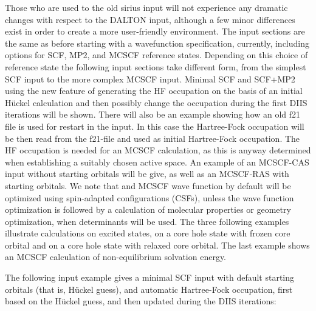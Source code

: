 Those who are used to the old {\sc sirius} input will not experience
any dramatic changes with respect to the DALTON
input, although a few minor differences exist in order
to create a more user-friendly environment. The input sections are the
same as before starting with a wavefunction specification, currently,
including options for SCF, MP2, and MCSCF reference states. Depending
on this choice of reference state the following input sections take
different form, from the simplest SCF input to the more complex MCSCF
input. Minimal SCF and SCF+MP2
using the new feature of generating the HF
occupation on the basis of an initial H\"{u}ckel
calculation and then 
possibly change the occupation during the first DIIS
iterations will be shown. There will also be an example showing how an
old f21 file is used for restart in the input. 
In this case the Hartree-Fock
occupation will be then read from the f21-file and used as initial
Hartree-Fock occupation.
The HF occupation is needed for an
MCSCF calculation, as this is anyway determined when
establishing a 
suitably chosen active space. An example of an
MCSCF-CAS input without starting 
orbitals will be give, as well as an
MCSCF-RAS with starting orbitals. We note that and MCSCF
wave function by 
default will be optimized using spin-adapted configurations
(CSFs),
unless the wave function optimization is followed by a calculation of
molecular properties or geometry optimization, when
determinants will 
be used. The three following examples illustrate calculations
on excited states, on a core
hole state with frozen core orbital and 
on a core hole state with relaxed core orbital.
The last example shows an MCSCF calculation of non-equilibrium 
solvation energy. 

\bigskip

The following input example gives a minimal
SCF input with default 
starting  orbitals (that is, H\"{u}ckel guess), and automatic Hartree-Fock
occupation, first based on the H\"{u}ckel guess, and
then updated during the DIIS iterations:

